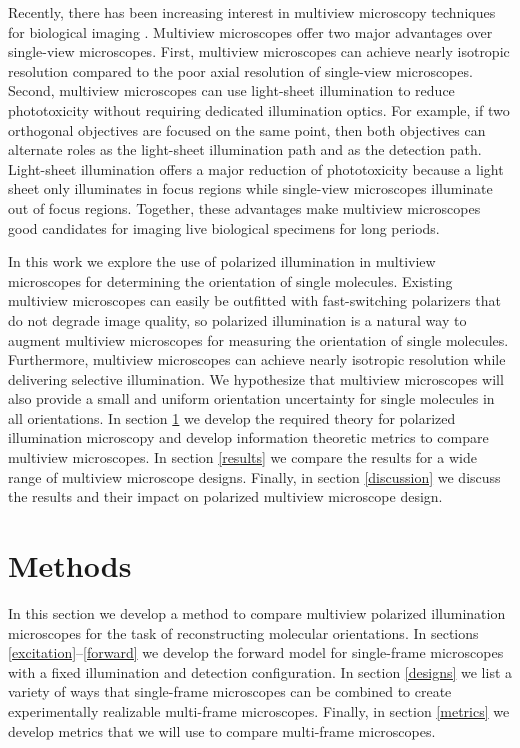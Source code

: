\documentclass[10pt]{article}
\begin{document}
Recently, there has been increasing interest in multiview microscopy techniques
for biological imaging \cite{wu2013, keller2015, wu2016, wu2017}. Multiview
microscopes offer two major advantages over single-view microscopes. First,
multiview microscopes can achieve nearly isotropic resolution compared to the
poor axial resolution of single-view microscopes. Second, multiview microscopes
can use light-sheet illumination to reduce phototoxicity without requiring
dedicated illumination optics. For example, if two orthogonal objectives are
focused on the same point, then both objectives can alternate roles as the
light-sheet illumination path and as the detection path. Light-sheet
illumination offers a major reduction of phototoxicity because a light sheet
only illuminates in focus regions while single-view microscopes illuminate out
of focus regions. Together, these advantages make multiview microscopes good
candidates for imaging live biological specimens for long periods.

In this work we explore the use of polarized illumination in multiview
microscopes for determining the orientation of single molecules. Existing
multiview microscopes can easily be outfitted with fast-switching polarizers
that do not degrade image quality, so polarized illumination is a natural way to
augment multiview microscopes for measuring the orientation of single
molecules. Furthermore, multiview microscopes can achieve nearly isotropic
resolution while delivering selective illumination. We hypothesize that
multiview microscopes will also provide a small and uniform orientation
uncertainty for single molecules in all orientations. In section \ref{methods}
we develop the required theory for polarized illumination microscopy and develop
information theoretic metrics to compare multiview microscopes. In section
\ref{results} we compare the results for a wide range of multiview microscope
designs. Finally, in section \ref{discussion} we discuss the results and their
impact on polarized multiview microscope design.

\section{Methods}\label{methods}
In this section we develop a method to compare multiview polarized illumination
microscopes for the task of reconstructing molecular orientations. In sections
\ref{excitation}--\ref{forward} we develop the forward model for single-frame
microscopes with a fixed illumination and detection configuration. In section
\ref{designs} we list a variety of ways that single-frame microscopes can be
combined to create experimentally realizable multi-frame microscopes. Finally,
in section \ref{metrics} we develop metrics that we will use to compare
multi-frame microscopes.
\end{document}
